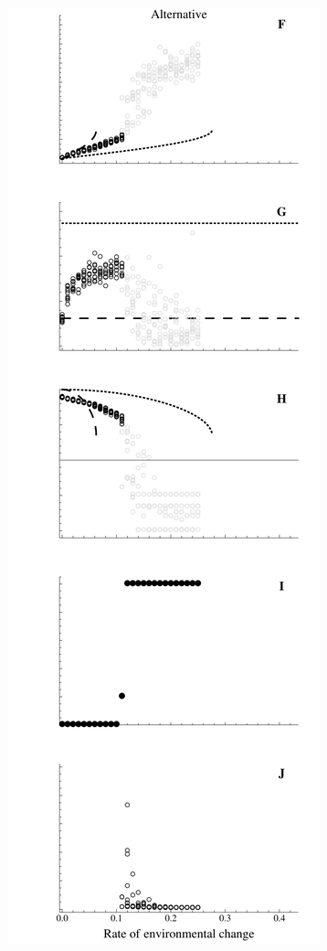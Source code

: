 \documentclass[12pt,letterpaper]{article} %
\begin{document}
\begin{figure}[!ht]
\includegraphics[width=0.45\linewidth]{IMAGES/AltSummaryMeanLargeBurn}
\caption{
}
\label{ModerateSummaryLast}
\end{figure}
%
%
\end{document}
